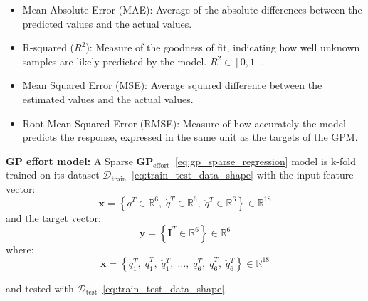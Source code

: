     \begin{itemize}
        \item Mean Absolute Error (MAE): Average of the absolute differences between the predicted values and the actual values.
        \item R-squared (\(R^2\)): Measure of the goodness of fit, indicating how well unknown samples are likely predicted by the model. \(R^2 \in [0,1]\).
        \item Mean Squared Error (MSE): Average squared difference between the estimated values and the actual values.
        \item Root Mean Squared Error (RMSE): Measure of how accurately the model predicts the response, expressed in the same unit as the targets of the GPM.
    \end{itemize}

    \vspace{1em}
    \textbf{GP effort model:}
    A Sparse \(\boldsymbol{GP}_{\text{effort}}\)~\eqref{eq:gp_sparse_regression} model is k-fold trained on its dataset \(\mathcal{D}_{\text{train}}\)~\eqref{eq:train_test_data_shape} with the input feature vector:
    \begin{equation}
    \boldsymbol{x} = \left\{ q^T \in \mathbb{R}^{6}, \; \dot{q}^T \in \mathbb{R}^{6}, \; \ddot{q}^T \in \mathbb{R}^{6} \right\} \in \mathbb{R}^{18}
    \label{eq:gp_effort_features_base}
    \end{equation}
    and the target vector:
    \begin{equation}
    \boldsymbol{y} = \left\{ \boldsymbol{I}^T \in \mathbb{R}^{6} \right\} \in \mathbb{R}^{6}
    \label{eq:gp_effort_targets}
    \end{equation}
    where:
    \begin{equation}
    \boldsymbol{x} = \left\{ q^T_1, \; \dot{q}^T_1, \; \ddot{q}^T_1, \; \ldots, \; q^T_6, \; \dot{q}^T_6, \; \ddot{q}^T_6 \right\} \in \mathbb{R}^{18}
    \label{eq:gp_effort_features_detail}
    \end{equation}

    and tested with \(\mathcal{D}_{\text{test}}\)~\eqref{eq:train_test_data_shape}.
    
